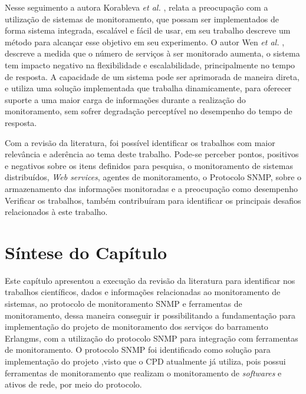 Nesse seguimento a autora Korableva \textit{et al.} \cite{korableva2017building}, relata a preocupação com a utilização de sistemas de monitoramento, que possam ser implementados de forma sistema integrada, escalável e fácil de usar, em seu trabalho descreve um método para alcançar esse objetivo em seu experimento. O autor Wen \textit{et al.} \cite{Junhao}, descreve a medida que o número de serviços à ser monitorado aumenta, o sistema tem impacto negativo na flexibilidade e escalabilidade, principalmente no tempo de resposta. A capacidade de um sistema pode ser aprimorada de maneira direta, e utiliza uma solução implementada que trabalha dinamicamente, para oferecer suporte a uma maior carga de informações durante a realização do monitoramento, sem sofrer degradação perceptível no desempenho do tempo de resposta. 

\vspace{10mm}
\noindent

Com a revisão da literatura, foi possível identificar os trabalhos com maior relevância e aderência ao tema deste trabalho. Pode-se perceber pontos, positivos e negativos sobre os itens definidos para pesquisa, o monitoramento de sistemas distribuídos, \textit{Web services}, agentes de monitoramento, o  Protocolo \acrshort{SNMP}, sobre o armazenamento das informações monitoradas e a preocupação como desempenho Verificar os trabalhos, também contribuíram para identificar os principais desafios relacionados à este trabalho.


\section{Síntese do Capítulo}

Este capítulo apresentou a execução da revisão da literatura para identificar nos trabalhos científicos, dados e informações relacionadas ao monitoramento de sistemas, ao protocolo de monitoramento \acrshort{SNMP} e ferramentas de monitoramento, dessa maneira conseguir ir possibilitando a fundamentação para implementação do projeto de monitoramento dos serviços do barramento Erlangms, com a utilização do protocolo \acrshort{SNMP} para integração com ferramentas de monitoramento. O protocolo \acrshort{SNMP} foi identificado como solução para implementação do projeto ,visto que o \acrshort{CPD} atualmente já utiliza, pois  possui ferramentas de monitoramento que realizam o monitoramento de \textit{softwares} e ativos de rede, por meio do protocolo. 

